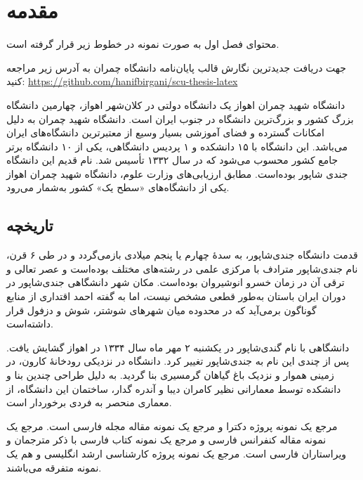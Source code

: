 
\chapter{مقدمه} \label{chapter:introduction}

محتوای فصل اول به صورت نمونه در خطوط زیر قرار گرفته است.

جهت دریافت جدیدترین نگارش قالب پایان‌نامه دانشگاه چمران به آدرس زیر مراجعه کنید:
\href{https://github.com/hanifbirgani/scu-thesis-latex}{https://github.com/hanifbirgani/scu-thesis-latex}

دانشگاه شهید چمران اهواز یک دانشگاه دولتی در کلان‌شهر اهواز، چهارمین دانشگاه بزرگ کشور و بزرگ‌ترین دانشگاه در جنوب ایران است. دانشگاه شهید چمران به دلیل امکانات گسترده و فضای آموزشی بسیار وسیع از معتبرترین دانشگاه‌های ایران می‌باشد. این دانشگاه با ۱۵ دانشکده و ۱ پردیس دانشگاهی، یکی از ۱۰ دانشگاه برتر جامع کشور محسوب می‌شود که در سال ۱۳۳۲ تأسیس شد. نام قدیم این دانشگاه جندی شاپور بوده‌است. مطابق ارزیابی‌های وزارت علوم، دانشگاه شهید چمران اهواز یکی از دانشگاه‌های «سطح یک» کشور به‌شمار می‌رود.
\section{تاریخچه}\label{sec:history}

قدمت دانشگاه جندی‌شاپور، به سدهٔ چهارم یا پنجم میلادی بازمی‌گردد و در طی ۶ قرن، نام جندی‌شاپور مترادف با مرکزی علمی در رشته‌های مختلف بوده‌است و عصر تعالی و ترقی آن در زمان خسرو انوشیروان بوده‌است. مکان شهر دانشگاهی جندی‌شاپور در دوران ایران باستان به‌طور قطعی مشخص نیست، اما به گفته احمد اقتداری از منابع گوناگون برمی‌آید که در محدوده میان شهرهای شوشتر، شوش و دزفول قرار داشته‌است.\cite{eghtedari00diyar}

دانشگاهی با نام گندی‌شاپور در یکشنبه ۲ مهر ماه سال ۱۳۳۴ در اهواز گشایش یافت. پس از چندی این نام به جندی‌شاپور تغییر کرد. دانشگاه در نزدیکی رودخانهٔ کارون، در زمینی هموار و نزدیک باغ گیاهان گرمسیری بنا گردید. به دلیل طراحی چندین بنا و دانشکده توسط معمارانی نظیر کامران دیبا و آندره گدار، ساختمان این دانشگاه، از معماری منحصر به فردی برخوردار است.

مرجع \cite{Omidali82phdThesis} یک نمونه پروژه دکترا و مرجع \cite{Vahedi87} یک نمونه مقاله مجله فارسی است.
مرجع \cite{Amintoosi87afzayesh}  یک نمونه  مقاله کنفرانس فارسی و
مرجع \cite{Pedram80osool} یک نمونه کتاب فارسی با ذکر مترجمان و ویراستاران فارسی است. مرجع \cite{Khalighi07MscThesis} یک نمونه پروژه کارشناسی ارشد انگلیسی و
\cite{Khalighi87xepersian} هم یک نمونه متفرقه  می‌باشند.

